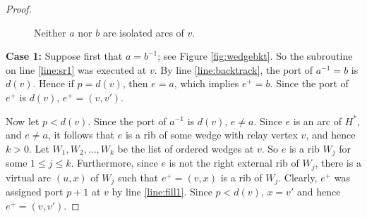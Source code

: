 \documentclass[12pt,letterpaper,oneside]{book}
\begin{document}
\begin{proof}
\begin{figure}[htp] 
\centering
{}
\caption[Neither the incoming nor outgoing arcs of a vertex are isolated]{Neither $a$ nor $b$ are isolated arcs of $v$.\label{fig:noneiso}}
\end{figure}



\noindent\textbf{Case 1: } Suppose first that $a=b^{-1}$; see Figure \ref{fig:wedgebkt}.  
So the subroutine on line \ref{line:sr1} was executed at $v$.  
By line \ref{line:backtrack}, the port of $a^{-1}=b$ is $d(v)$.  Hence if $p=d(v)$, then $e=a$, which implies 
$e^+=b$.  
Since the port of $e^+$ is $d(v)$, $e^+=(v,v')$.  

Now let $p< d(v)$.  %
Since the port of $a^{-1}$ is $d(v)$, $e\ne a$.  Since $e$ is an arc of $H^*$, and $e\ne a$, it follows that 
$e$ is a rib of some wedge with relay 
vertex $v$, and hence $k>0$.  Let $W_1,W_2,\ldots,W_k$ be the list of ordered wedges at 
$v$.  So $e$ is a rib $W_j$ for some $1\le j\le k$.  %
Furthermore, since $e$ is not 
the right external rib of $W_j$, there is a virtual arc 
$(u,x)$ of $W_j$ such that $e^+=(v,x)$ is a rib of $W_j$.  Clearly, $e^+$ was assigned port $p+1$ at $v$ by line \ref{line:fill1}.  
Since $p< d(v)$, $x=v'$ and hence $e^+=(v,v')$.


\end{proof}
\end{document}
